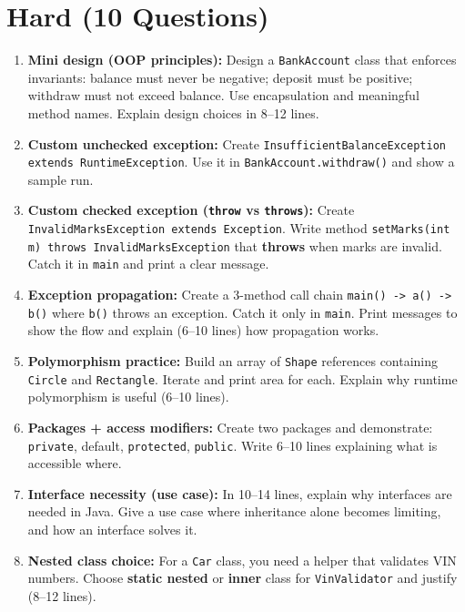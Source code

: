 \documentclass[11pt,a4paper]{article}
\begin{document}
\section*{Hard (10 Questions)}
\begin{enumerate}[label=H\arabic*., leftmargin=*]
  \item \textbf{Mini design (OOP principles):} Design a \texttt{BankAccount} class that enforces invariants:
    balance must never be negative; deposit must be positive; withdraw must not exceed balance.
    Use encapsulation and meaningful method names. Explain design choices in 8--12 lines.

  \item \textbf{Custom unchecked exception:} Create \texttt{InsufficientBalanceException extends RuntimeException}.
    Use it in \texttt{BankAccount.withdraw()} and show a sample run.

  \item \textbf{Custom checked exception (\texttt{throw} vs \texttt{throws}):} Create \texttt{InvalidMarksException extends Exception}.
    Write method \texttt{setMarks(int m) throws InvalidMarksException} that \textbf{throws} when marks are invalid.
    Catch it in \texttt{main} and print a clear message.

  \item \textbf{Exception propagation:} Create a 3-method call chain \texttt{main() -> a() -> b()} where \texttt{b()} throws an exception.
    Catch it only in \texttt{main}. Print messages to show the flow and explain (6--10 lines) how propagation works.

  \item \textbf{Polymorphism practice:} Build an array of \texttt{Shape} references containing \texttt{Circle} and \texttt{Rectangle}.
    Iterate and print area for each. Explain why runtime polymorphism is useful (6--10 lines).

  \item \textbf{Packages + access modifiers:} Create two packages and demonstrate:
    \texttt{private}, default, \texttt{protected}, \texttt{public}. Write 6--10 lines explaining what is accessible where.

  \item \textbf{Interface necessity (use case):} In 10--14 lines, explain why interfaces are needed in Java.
    Give a use case where inheritance alone becomes limiting, and how an interface solves it.

  \item \textbf{Nested class choice:} For a \texttt{Car} class, you need a helper that validates VIN numbers.
    Choose \textbf{static nested} or \textbf{inner} class for \texttt{VinValidator} and justify (8--12 lines).


\end{enumerate}
\end{document}
